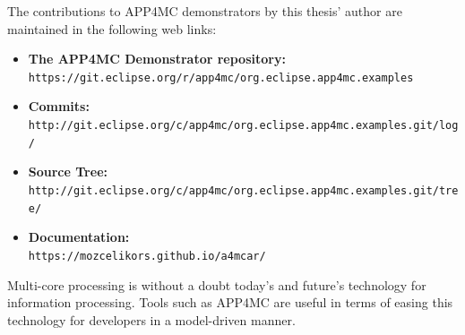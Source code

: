 The contributions to APP4MC demonstrators by this thesis' author are maintained in the following web links:
\begin{itemize}
	\item \textbf{The APP4MC Demonstrator repository:} \\ \texttt{https://git.eclipse.org/r/app4mc/org.eclipse.app4mc.examples}
	\item \textbf{Commits:} \\ \texttt{http://git.eclipse.org/c/app4mc/org.eclipse.app4mc.examples.git/log/}
	\item \textbf{Source Tree:} \\ \texttt{http://git.eclipse.org/c/app4mc/org.eclipse.app4mc.examples.git/tree/}
	\item \textbf{Documentation:} \\
	\texttt{https://mozcelikors.github.io/a4mcar/}
\end{itemize}

Multi-core processing is without a doubt today's and future's technology for information processing. Tools such as APP4MC are useful in terms of easing this technology for developers in a model-driven manner. 



